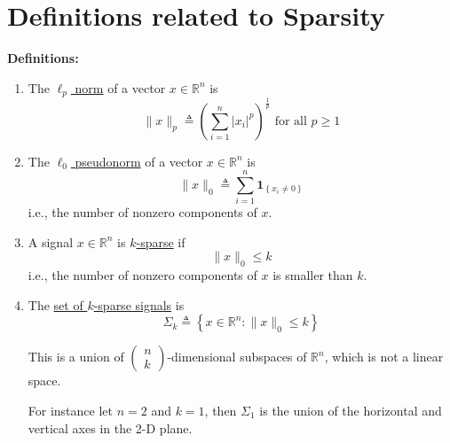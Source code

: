 \documentclass[11pt]{elegantbook}
\begin{document}
\section{Definitions related to Sparsity}
\textbf{Definitions:}
\begin{enumerate}
    \item 
    \begin{definition}
        The \underline{$\ell_p$ norm} of a vector $x \in \mathbb{R}^n$ is
            $$\|x\|_p \triangleq\left(\sum_{i=1}^n\left|x_i\right|^p\right)^{\frac{1}{p}}\text{ for all }p \geq 1$$
    \end{definition}
    \item 
    \begin{definition}
        The \underline{$\ell_0$ pseudonorm} of a vector $x \in \mathbb{R}^n$ is $$\|x\|_0 \triangleq \sum_{i=1}^n \mathbf{1}_{\left\{x_i \neq 0\right\}}$$ i.e., the number of nonzero components of $x$.
    \end{definition}
    \item 
    \begin{definition}[$k$-sparse]
        A signal $x \in \mathbb{R}^n$ is \underline{$k$-sparse} if $$\|x\|_0 \leq k$$ i.e., the number of nonzero components of $x$ is smaller than $k$.
    \end{definition}
    \item 
    \begin{definition}
        The \underline{set of $k$-sparse signals} is $$\Sigma_k \triangleq\left\{x \in \mathbb{R}^n:\|x\|_0 \leq k\right\}$$
    \end{definition}
    This is a union of $\left(\begin{array}{l}n \\ k\end{array}\right)$-dimensional subspaces of $\mathbb{R}^n$, which is not a linear space.
    
    For instance let $n=2$ and $k=1$, then $\Sigma_1$ is the union of the horizontal and vertical axes in the 2-D plane.


\end{enumerate}
\end{document}
